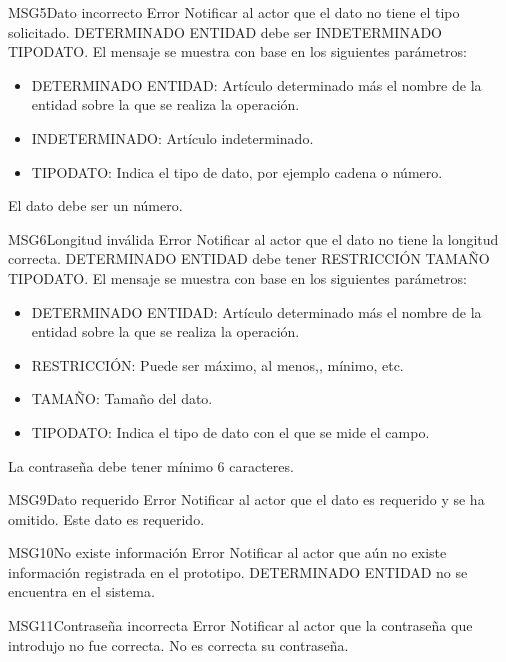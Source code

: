 \begin{Message}{MSG5}{Dato incorrecto} 
	\MSGitem[Tipo: ] Error
	\MSGitem[Objetivo: ] Notificar al actor que el dato no tiene el tipo solicitado.
	\MSGitem[Redacción: ] DETERMINADO ENTIDAD debe ser INDETERMINADO TIPODATO.
	\MSGitem[Parámetros: ] El mensaje se muestra con base en los siguientes parámetros:
		\begin{itemize}	
			\item DETERMINADO ENTIDAD: Artículo determinado más el nombre de la entidad sobre la que se realiza la operación.
			\item INDETERMINADO: Artículo indeterminado.
			\item TIPODATO: Indica el tipo de dato, por ejemplo cadena o número.
		\end{itemize}		
	\MSGitem[Ejemplo: ] El dato debe ser un número.
\end{Message}

\begin{Message}{MSG6}{Longitud inválida} 
	\MSGitem[Tipo: ] Error
	\MSGitem[Objetivo: ] Notificar al actor que el dato no tiene la longitud correcta.
	\MSGitem[Redacción: ] DETERMINADO ENTIDAD debe tener RESTRICCIÓN TAMAÑO TIPODATO.
	\MSGitem[Parámetros: ] El mensaje se muestra con base en los siguientes parámetros:
		\begin{itemize}	
			\item DETERMINADO ENTIDAD: Artículo determinado más el nombre de la entidad sobre la que se realiza la operación.
			\item RESTRICCIÓN: Puede ser máximo, al menos,, mínimo, etc.
			\item TAMAÑO: Tamaño del dato.
			\item TIPODATO: Indica el tipo de dato con el que se mide el campo.
		\end{itemize}		
	\MSGitem[Ejemplo: ] La contraseña debe tener mínimo 6 caracteres.
\end{Message}

\begin{Message}{MSG9}{Dato requerido} 
	\MSGitem[Tipo: ] Error
	\MSGitem[Objetivo: ] Notificar al actor que el dato es requerido y se ha omitido.
	\MSGitem[Redacción: ] Este dato es requerido.
\end{Message}

\begin{Message}{MSG10}{No existe información} 
	\MSGitem[Tipo: ] Error
	\MSGitem[Objetivo: ] Notificar al actor que aún no existe información registrada en el prototipo.
	\MSGitem[Redacción: ] DETERMINADO ENTIDAD no se encuentra en el sistema.
\end{Message}

\begin{Message}{MSG11}{Contraseña incorrecta} 
	\MSGitem[Tipo: ] Error
	\MSGitem[Objetivo: ] Notificar al actor que la contraseña que introdujo no fue correcta.
	\MSGitem[Redacción: ] No es correcta su contraseña.
\end{Message}
